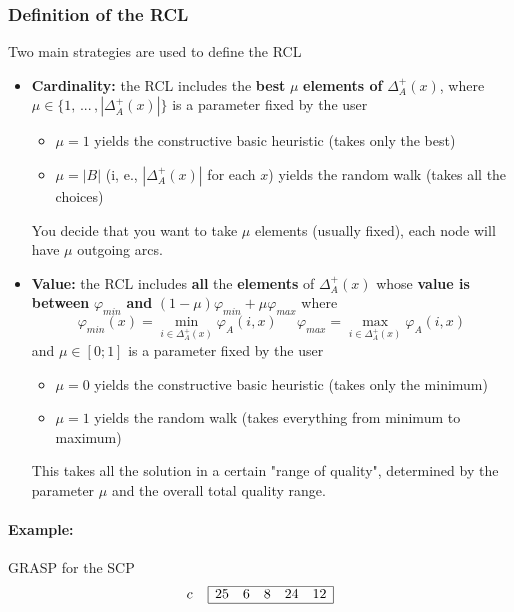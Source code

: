 \subsubsection{Definition of the RCL}
Two main strategies are used to define the RCL
\begin{itemize}
	\item \textbf{Cardinality:} the RCL includes the \textbf{best} $\mu$ \textbf{elements of} $\Delta_A^+ (x)$, where $\mu \in \{1,\, ... \, , |\Delta_A^+(x)|\}$ is a parameter fixed by the user
	\begin{itemize}
		\item $\mu = 1$ yields the constructive basic heuristic (takes only the best)
		\item $\mu = |B|$ (i, e., $|\Delta_A^+ (x)|$ for each $x$) yields the random walk (takes all the choices)
	\end{itemize}
	You decide that you want to take $\mu$ elements (usually fixed), each node will have $\mu$ outgoing arcs.\\
	
	\item \textbf{Value:} the RCL includes \textbf{all} the \textbf{elements} of $\Delta_A^+ (x)$ whose \textbf{value is between} $\varphi_{min}$ \textbf{and} $(1 − \mu) \varphi_{min} + \mu \varphi_{max}$ where
	$$ \varphi_{min} (x) = \min_{i \in \Delta_A^+ (x)} \varphi_A (i,x) \;\;\;\;\; \varphi_{max} = \max_{i \in \Delta_A^+ (x)} \varphi_A (i,x) $$
	and $\mu \in [0; 1]$ is a parameter fixed by the user
	\begin{itemize}
		\item $\mu = 0$ yields the constructive basic heuristic (takes only the minimum)
		\item $\mu = 1$ yields the random walk (takes everything from minimum to maximum)
	\end{itemize}
	This takes all the solution in a certain "range of quality", determined by the parameter $\mu$ and the overall total quality range.\\
\end{itemize}

\newpage

\paragraph{Example:} GRASP for the SCP 
$$
c \;\;\;\;
\begin{array}{| c c c c c |}
	\hline
	25 & 6 & 8 & 24 & 12 \\
	\hline
\end{array}
$$

